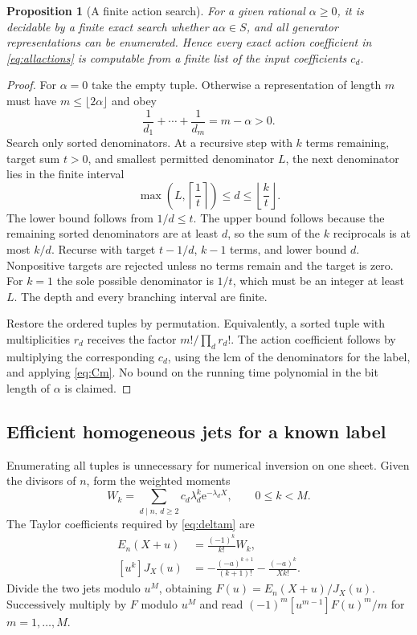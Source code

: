 \documentclass[11pt,a4paper]{article}
\numberwithin{equation}{section}
\newtheorem{proposition}[theorem]{Proposition}
\theoremstyle{definition}
\theoremstyle{remark}
\newcommand{\ee}{\mathrm e}
\begin{document}
\begin{proposition}[A finite action search]\label{prop:actionalgorithm}
For a given rational $\alpha\ge0$, it is decidable by a finite exact
search whether $a\alpha\in S$, and all generator representations can
be enumerated. Hence every exact action coefficient in
\eqref{eq:allactions} is computable from a finite list of the input
coefficients $c_d$.
\end{proposition}
\begin{proof}
For $\alpha=0$ take the empty tuple. Otherwise a representation of
length $m$ must have $m\le\lfloor2\alpha\rfloor$ and obey
\begin{equation}
 \frac1{d_1}+\cdots+\frac1{d_m}=m-\alpha>0.
 \label{eq:egyptian}
\end{equation}
Search only sorted denominators. At a recursive step with $k$ terms
remaining, target sum $t>0$, and smallest permitted denominator $L$,
the next denominator lies in the finite interval
\begin{equation}
 \max\!\left(L,\left\lceil\frac1t\right\rceil\right)
 \le d\le\left\lfloor\frac{k}{t}\right\rfloor.
 \label{eq:denomrange}
\end{equation}
The lower bound follows from $1/d\le t$. The upper bound follows
because the remaining sorted denominators are at least $d$, so the
sum of the $k$ reciprocals is at most $k/d$. Recurse with target
$t-1/d$, $k-1$ terms, and lower bound $d$. Nonpositive targets are
rejected unless no terms remain and the target is zero. For $k=1$
the sole possible denominator is $1/t$, which must be an integer at
least $L$. The depth and every branching interval are finite.

Restore the ordered tuples by permutation. Equivalently, a sorted tuple
with multiplicities $r_d$ receives the factor $m!/\prod_d r_d!$.
The action coefficient follows by multiplying the corresponding
$c_d$, using the lcm of the denominators for the label, and applying
\eqref{eq:Cm}. No bound on the running time polynomial in the bit
length of $\alpha$ is claimed.
\end{proof}

\subsection{Efficient homogeneous jets for a known label}

Enumerating all tuples is unnecessary for numerical inversion on one
sheet. Given the divisors of $n$, form the weighted moments
\begin{equation}
 W_k=\sum_{d\mid n,\ d\ge2}c_d\lambda_d^k\ee^{-\lambda_dX},
 \qquad 0\le k<M.
 \label{eq:Wk}
\end{equation}
The Taylor coefficients required by \eqref{eq:deltam} are
\begin{align}
 [u^k]E_n(X+u)&=\frac{(-1)^k}{k!}W_k,\label{eq:Ejet}\\
 [u^k]J_X(u)&=-\frac{(-a)^{k+1}}{(k+1)!}
              -\frac{(-a)^k}{Xk!}.\label{eq:Jjet}
\end{align}
Divide the two jets modulo $u^M$, obtaining
$F(u)=E_n(X+u)/J_X(u)$. Successively multiply by $F$ modulo $u^M$
and read $(-1)^m[u^{m-1}]F(u)^m/m$ for $m=1,\ldots,M$.
\end{document}
